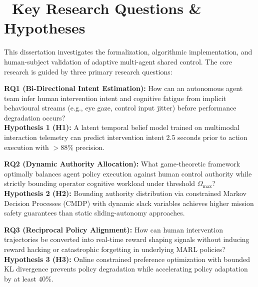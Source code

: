 \documentclass[11pt,a4paper]{scrartcl}
\begin{document}
\vspace{10pt}

\section{\texorpdfstring{\faQuestionCircle\ }{ }Key Research Questions \& Hypotheses}

This dissertation investigates the formalization, algorithmic implementation, and human-subject validation of adaptive multi-agent shared control. The core research is guided by three primary research questions:

\begin{highlightbox}
    \sffamily
    \textbf{\color{NavyPrimary}RQ1 (Bi-Directional Intent Estimation):} How can an autonomous agent team infer human intervention intent and cognitive fatigue from implicit behavioural streams (e.g., eye gaze, control input jitter) before performance degradation occurs?\\
    \textbf{\color{NavyPrimary}Hypothesis 1 (H1):} A latent temporal belief model trained on multimodal interaction telemetry can predict intervention intent 2.5 seconds prior to action execution with $>88\%$ precision.
\end{highlightbox}

\vspace{6pt}

\begin{highlightbox}
    \sffamily
    \textbf{\color{NavyPrimary}RQ2 (Dynamic Authority Allocation):} What game-theoretic framework optimally balances agent policy execution against human control authority while strictly bounding operator cognitive workload under threshold $\Omega_{\max}$?\\
    \textbf{\color{NavyPrimary}Hypothesis 2 (H2):} Bounding authority distribution via constrained Markov Decision Processes (CMDP) with dynamic slack variables achieves higher mission safety guarantees than static sliding-autonomy approaches.
\end{highlightbox}

\vspace{6pt}

\begin{highlightbox}
    \sffamily
    \textbf{\color{NavyPrimary}RQ3 (Reciprocal Policy Alignment):} How can human intervention trajectories be converted into real-time reward shaping signals without inducing reward hacking or catastrophic forgetting in underlying MARL policies?\\
    \textbf{\color{NavyPrimary}Hypothesis 3 (H3):} Online constrained preference optimization with bounded KL divergence prevents policy degradation while accelerating policy adaptation by at least $40\%$.
\end{highlightbox}
\end{document}
